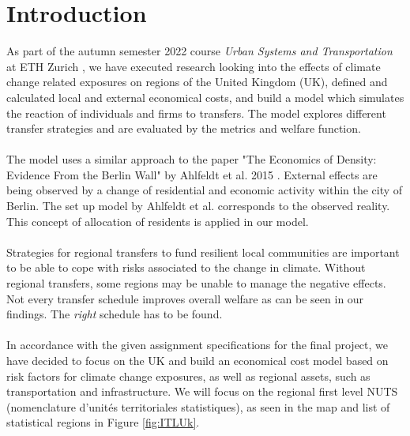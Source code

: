 \documentclass[10pt,a4paper]{article}
\begin{document}
\section{Introduction}
As part of the autumn semester 2022 course \textit{Urban Systems and Transportation} at ETH Zurich \cite{course}, we have executed research looking into the effects of climate change related exposures on regions of the United Kingdom (UK), defined and calculated local and external economical costs, and build a model which simulates the reaction of individuals and firms to transfers. The model explores different transfer strategies and are evaluated by the metrics and welfare function. \\\\
The model uses a similar approach to the paper "The Economics of Density:
Evidence From the Berlin Wall" by Ahlfeldt et al. 2015 \cite{ahlfeldt2015economics}. External effects are being observed by a change of residential and economic activity within the city of Berlin. The set up model by Ahlfeldt et al. corresponds to the observed reality. This concept of allocation of residents is applied in our model.
\\\\
Strategies for regional transfers to fund resilient local communities are important to be able to cope with risks associated to the change in climate. Without regional transfers, some regions may be unable to manage the negative effects. Not every transfer schedule improves overall welfare as can be seen in our findings. The \textit{right} schedule has to be found.
\\\\
In accordance with the given assignment specifications for the final project, we have decided to focus on the UK and build an economical cost model based on risk factors for climate change exposures, as well as regional assets, such as transportation and infrastructure. We will focus on the regional first level NUTS (nomenclature d'unités territoriales statistiques)\cite{2022firstlevel,2022international}, as seen in the map and list of statistical regions in Figure \ref{fig:ITLUk}.\\
\end{document}
